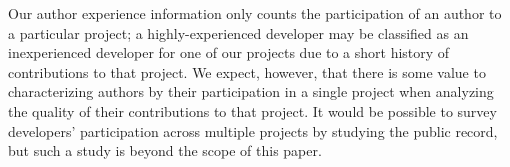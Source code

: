 Our author experience information only counts the participation of an author to
a particular project; a highly-experienced developer may be classified as an
inexperienced developer for one of our projects due to a short history of
contributions to that project. We expect, however, that there is some value to
characterizing authors by their participation in a single project when analyzing
the quality of their contributions to that project. It would be possible to
survey developers' participation across multiple projects by studying the public
record, but such a study is beyond the scope of this paper.
